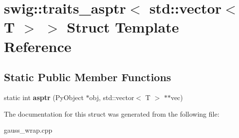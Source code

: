 \hypertarget{structswig_1_1traits__asptr_3_01std_1_1vector_3_01_t_01_4_01_4}{\section{swig\-:\-:traits\-\_\-asptr$<$ std\-:\-:vector$<$ T $>$ $>$ Struct Template Reference}
\label{structswig_1_1traits__asptr_3_01std_1_1vector_3_01_t_01_4_01_4}
}
\subsection*{Static Public Member Functions}
\begin{DoxyCompactItemize}
\item 
\hypertarget{structswig_1_1traits__asptr_3_01std_1_1vector_3_01_t_01_4_01_4_abffecd25e704a44cd75d02ccde1efbe4}{static int {\bfseries asptr} (Py\-Object $\ast$obj, std\-::vector$<$ T $>$ $\ast$$\ast$vec)}\label{structswig_1_1traits__asptr_3_01std_1_1vector_3_01_t_01_4_01_4_abffecd25e704a44cd75d02ccde1efbe4}

\end{DoxyCompactItemize}


The documentation for this struct was generated from the following file\-:\begin{DoxyCompactItemize}
\item 
gauss\-\_\-wrap.\-cpp\end{DoxyCompactItemize}
